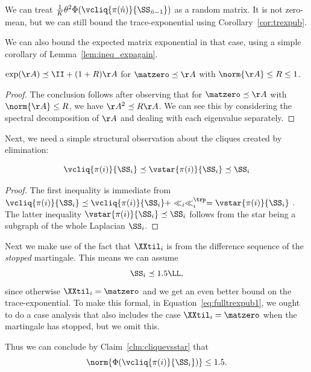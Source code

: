 We can treat
$\frac{1}{K}\theta^2\Phi(\vcliq{\pi(\hat{n})}{\SS_{\hat{n}-1}})$ as a random
matrix.
It is not zero-mean, but we can still bound the trace-exponential
using Corollary~\ref{cor:trexpub}.

We can also bound the expected matrix exponential in
that case, using a simple corollary of Lemma~\ref{lem:ineq_expagain}.
\begin{corollary}\label{cor:ineq_exp_cher}
  $\exp(\AA) \preceq \II + (1+R)\AA $
  for $\matzero \preceq \AA$ with $\norm{\AA} \leq R \leq 1$.
\end{corollary}
\begin{proof}
  The conclusion follows after observing that for $\matzero \preceq \AA$ with $\norm{\AA} \leq R$,
  we have $\AA^2 \preceq R \AA$.
  We can see this by considering the spectral decomposition of $\AA$
  and dealing with each eigenvalue separately.
\end{proof}

Next, we need a simple structural observation about the cliques
created by elimination:
\begin{claim}
  \label{clm:cliquevsstar}
  \[
    \vcliq{\pi(i)}{\SS_i} \preceq \vstar{\pi(i)}{\SS_i} \preceq \SS_i
  \]
\end{claim}
\begin{proof}
  The first inequality is immediate from
  $
     \vcliq{\pi(i)}{\SS_i} \preceq   \vcliq{\pi(i)}{\SS_i} + \ll_i\ll_i^\trp
     =
     \vstar{\pi(i)}{\SS_i}
   $
   .
   The latter inequality $\vstar{\pi(i)}{\SS_i} \preceq \SS_i$
  follows from the star being a subgraph of the whole Laplacian $\SS_i$.
\end{proof}

Next we make use of the fact that $\XXtil_{i}$ is from the
difference sequence of the \emph{stopped} martingale.
This means we can assume
\[
  \SS_{i} \preceq 1.5 \LL,
\]
since
otherwise $\XXtil_{i} = \matzero$ and we get an even better
bound on the trace-exponential.
To make this formal, in Equation~\eqref{eq:fulltrexpub1},
we ought to do a case analysis that also includes
the case $\XXtil_{i} = \matzero$ when the martingale has
stopped, but we omit this.

Thus we can conclude by Claim~\ref{clm:cliquevsstar} that
\[
  \norm{\Phi(\vcliq{\pi(i)}{\SS_{i}})} \leq 1.5.
\]

